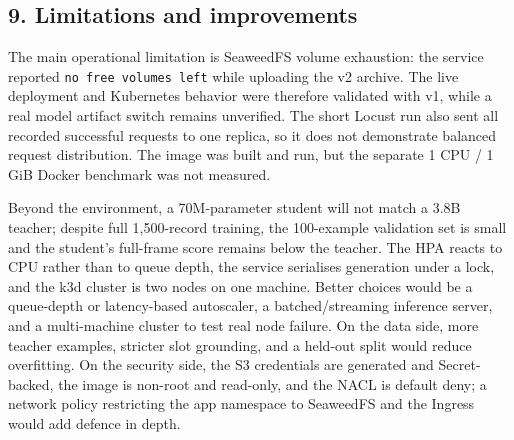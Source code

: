 \documentclass[
]{article}
\begin{document}
\hypertarget{limitations-and-improvements}{%
\subsection{9. Limitations and
improvements}\label{limitations-and-improvements}}

The main operational limitation is SeaweedFS volume exhaustion: the
service reported \texttt{no\ free\ volumes\ left} while uploading the v2
archive. The live deployment and Kubernetes behavior were therefore
validated with v1, while a real model artifact switch remains
unverified. The short Locust run also sent all recorded successful
requests to one replica, so it does not demonstrate balanced request
distribution. The image was built and run, but the separate 1 CPU / 1
GiB Docker benchmark was not measured.

Beyond the environment, a 70M-parameter student will not match a 3.8B
teacher; despite full 1,500-record training, the 100-example validation
set is small and the student's full-frame score remains below the
teacher. The HPA reacts to CPU rather than to queue depth, the service
serialises generation under a lock, and the k3d cluster is two nodes on
one machine. Better choices would be a queue-depth or latency-based
autoscaler, a batched/streaming inference server, and a multi-machine
cluster to test real node failure. On the data side, more teacher
examples, stricter slot grounding, and a held-out split would reduce
overfitting. On the security side, the S3 credentials are generated and
Secret-backed, the image is non-root and read-only, and the NACL is
default deny; a network policy restricting the app namespace to
SeaweedFS and the Ingress would add defence in depth.
\end{document}

